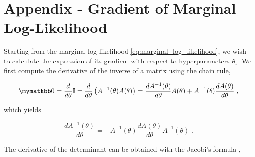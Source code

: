 \documentclass{article}
\begin{document}
{





\newpage
\printbibliography


\newpage
\appendix
\appendixpage

\section{Appendix - Gradient of Marginal Log-Likelihood} \label{sec:marginal_log_likelihood_gradient}

Starting from the marginal log-likelihood \eqref{eq:marginal_log_likelihood}, we wish to calculate the expression of its gradient with respect to hyperparameters $\theta_i$. We first compute the derivative of the inverse of a matrix using the chain rule,

\begin{equation*}
    \mymathbb 0 = \frac{d}{d \theta} \Id = \frac{d}{d \theta} \left( A^{-1}(\theta) A(\theta) \right) = \frac{d A^{-1}(\theta)}{d \theta} A(\theta) + A^{-1}(\theta) \frac{d A(\theta)}{d \theta}
     \;,
\end{equation*}

which yields

\begin{equation*}
    \frac{d A^{-1}(\theta) }{d \theta} = - A^{-1}(\theta) \frac{d A(\theta)}{d \theta} A^{-1}(\theta) \; .
\end{equation*}


The derivative of the determinant can be obtained with the Jacobi's formula %
,

}
\end{document}
